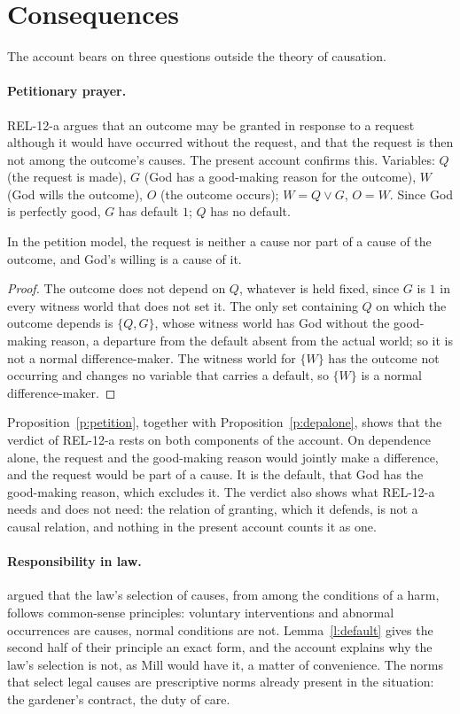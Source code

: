 \documentclass{situationist-preprint}
\begin{document}
\section{Consequences}\label{s:consequences}

The account bears on three questions outside the theory of causation.

\paragraph{Petitionary prayer.} REL-12-a argues that an outcome may be granted in response to a request although it would have occurred without the request, and that the request is then not among the outcome's causes. The present account confirms this. Variables: $Q$ (the request is made), $G$ (God has a good-making reason for the outcome), $W$ (God wills the outcome), $O$ (the outcome occurs); $W = Q \vee G$, $O = W$. Since God is perfectly good, $G$ has default $1$; $Q$ has no default.

\begin{proposition}[Petition]\label{p:petition}
In the petition model, the request is neither a cause nor part of a cause of the outcome, and God's willing is a cause of it.
\end{proposition}

\begin{proof}
The outcome does not depend on $Q$, whatever is held fixed, since $G$ is $1$ in every witness world that does not set it. The only set containing $Q$ on which the outcome depends is $\{Q, G\}$, whose witness world has God without the good-making reason, a departure from the default absent from the actual world; so it is not a normal difference-maker. The witness world for $\{W\}$ has the outcome not occurring and changes no variable that carries a default, so $\{W\}$ is a normal difference-maker.
\end{proof}

Proposition~\ref{p:petition}, together with Proposition~\ref{p:depalone}, shows that the verdict of REL-12-a rests on both components of the account. On dependence alone, the request and the good-making reason would jointly make a difference, and the request would be part of a cause. It is the default, that God has the good-making reason, which excludes it. The verdict also shows what REL-12-a needs and does not need: the relation of granting, which it defends, is not a causal relation, and nothing in the present account counts it as one.

\paragraph{Responsibility in law.} \citet{HartHonore1985} argued that the law's selection of causes, from among the conditions of a harm, follows common-sense principles: voluntary interventions and abnormal occurrences are causes, normal conditions are not. Lemma~\ref{l:default} gives the second half of their principle an exact form, and the account explains why the law's selection is not, as Mill would have it, a matter of convenience. The norms that select legal causes are prescriptive norms already present in the situation: the gardener's contract, the duty of care.
\end{document}
